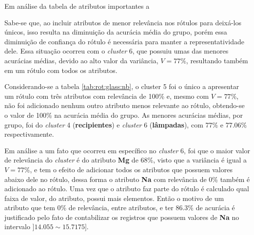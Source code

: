 Em análise da tabela de atributos importantes a

Sabe-se que, ao incluir atributos de menor relevância nos rótulos para deixá-los únicos, isso resulta na diminuição da acurácia média do grupo, porém essa diminuição de confiança do rótulo é necessária para manter a representatividade dele. Essa situação ocorreu com o \textit{cluster} 6, que possuiu umas das menores acurácias médias, devido ao alto valor da variância, ${V=77\%}$, resultando também em um rótulo com todos os atributos. 

Considerando-se a tabela \ref{tab:rot:glass:nb}, o cluster 5 foi o único a apresentar um rótulo com três atributos com relevância de 100\% e, mesmo com ${V=77\%}$, não foi adicionado nenhum outro atributo menos relevante ao rótulo, obtendo-se o valor de 100\% na acurácia média do grupo. As menores acurácias médias, por grupo, foi do \textit{cluster} 4 (\textbf{recipientes}) e \textit{cluster} 6 (\textbf{lâmpadas}), com 77\% e 77.06\% respectivamente. 

Em análise a um fato que ocorreu em específico no \textit{cluster} 6, foi que o maior valor de relevância do \textit{cluster} é do atributo \textbf{Mg} de 68\%, visto que a variância é igual a ${V=77\%}$, e tem o efeito de adicionar todos os atributos que possuem valores abaixo dele no rótulo, dessa forma o atributo \textbf{Na} com relevância de 0\% também é adicionado ao rótulo. Uma vez que o atributo faz parte do rótulo é calculado  qual  faixa de valor, do atributo, possui mais elementos. Então o motivo de um atributo que tem 0\% de relevância, entre atributos, e ter 86.3\% de acurácia é justificado pelo fato de contabilizar os registros que possuem valores de \textbf{Na} no intervalo ${]14.055 \sim 15.7175 ]}$. 

